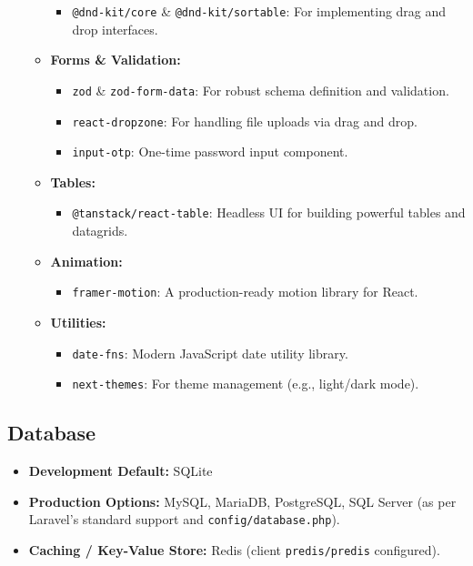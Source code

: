 \documentclass[12pt,a4paper]{article}
\begin{document}
\begin{itemize}
\begin{itemize}
        \begin{itemize}
            \item \texttt{@dnd-kit/core} \& \texttt{@dnd-kit/sortable}: For implementing drag and drop interfaces.
        \end{itemize}
        \item \textbf{Forms \& Validation:}
        \begin{itemize}
            \item \texttt{zod} \& \texttt{zod-form-data}: For robust schema definition and validation.
            \item \texttt{react-dropzone}: For handling file uploads via drag and drop.
            \item \texttt{input-otp}: One-time password input component.
        \end{itemize}
        \item \textbf{Tables:}
        \begin{itemize}
            \item \texttt{@tanstack/react-table}: Headless UI for building powerful tables and datagrids.
        \end{itemize}
        \item \textbf{Animation:}
        \begin{itemize}
            \item \texttt{framer-motion}: A production-ready motion library for React.
        \end{itemize}
        \item \textbf{Utilities:}
        \begin{itemize}
            \item \texttt{date-fns}: Modern JavaScript date utility library.
            \item \texttt{next-themes}: For theme management (e.g., light/dark mode).
        \end{itemize}
    \end{itemize}
\end{itemize}

\subsection{Database}
\begin{itemize}
    \item \textbf{Development Default:} SQLite
    \item \textbf{Production Options:} MySQL, MariaDB, PostgreSQL, SQL Server (as per Laravel's standard support and \texttt{config/database.php}).
    \item \textbf{Caching / Key-Value Store:} Redis (client \texttt{predis/predis} configured).
\end{itemize}
\end{document}
